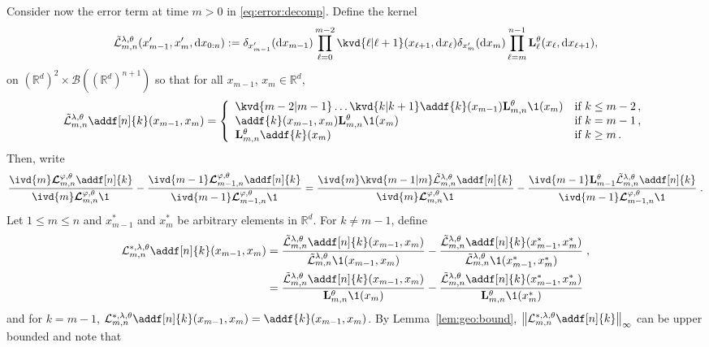 \documentclass{article}
\begin{document}
Consider now the error term at time $m>0$ in \eqref{eq:error:decomp}.  Define the kernel  
\begin{equation} \label{eq:def:retrokmod:joint}
    \tilde{\mathcal{L}}^{\parvar,\parvec}_{m, n}(x'_{m-1},x_m', \rmd x_{0:n}) \eqdef \delta_{x'_{m-1}}(\rmd x_{m-1})  \prod_{\ell = 0}^{m - 2} \kvd{\ell \vert \ell+1}(x_{\ell + 1}, \rmd x_\ell) \delta_{x_m'}(\rmd x_m) \prod_{\ell = m}^{n - 1} \uk{\ell}{\parvec}(x_\ell, \rmd x_{\ell + 1}), 
\end{equation}
on  $(\mathbb{R}^d)^2 \times \mathcal{B}((\mathbb{R}^d)^{n+1})$ so that for all $x_{m-1}$, $x_m\in\mathbb{R}^d$,
$$
\tilde{\mathcal{L}}^{\parvar,\parvec}_{m, n}\addf[n]{k}(x_{m-1},x_m) = \left\{
    \begin{array}{ll}
      \kvd{m-2 \vert m-1}\ldots \kvd{k \vert k+1}\addf{k}(x_{m-1})\uk{m, n}{\parvec}\1(x_m) & \mbox{if } k\leq m-2\,, \\
      \addf{k}(x_{m-1},x_m)\uk{m, n}{\parvec}\1(x_m) & \mbox{if } k = m-1\,, \\
       \uk{m, n}{\parvec}\addf{k}(x_m)  & \mbox{if } k\geq m\,.
    \end{array}
\right.
$$
Then, write
$$
\frac{\ivd{m} \retrokmod_{m, n} \addf[n]{k}}{\ivd{m} \retrokmod_{m, n} \1_{}}
- \frac{\ivd{m - 1} \retrokmod_{m - 1, n} \addf[n]{k}}{\ivd{m - 1} \retrokmod_{m - 1, n} \1_{}} 
=
\frac{\ivd{m} \kvd{m-1 \vert m} \tilde{\mathcal{L}}^{\parvar,\parvec}_{m, n} \addf[n]{k}}{\ivd{m} \retrokmod_{m, n} \1_{}}
- \frac{\ivd{m - 1} \uk{m-1}{\parvec} \tilde{\mathcal{L}}^{\parvar,\parvec}_{m, n} \addf[n]{k}}{\ivd{m - 1} \retrokmod_{m - 1, n} \1_{}} \eqsp.
$$
Let $1\leq m \leq n$ and $x_{m-1}^*$ and $x_m^*$ be arbitrary elements in $\mathbb{R}^d$. For $k\neq m-1$, define 
\begin{align}
\mathcal{L}^{*,\parvar,\parvec}_{m, n}\addf[n]{k}(x_{m-1},x_m) &= \frac{\tilde{\mathcal{L}}^{\parvar,\parvec}_{m, n}\addf[n]{k}(x_{m-1},x_m) }{\tilde{\mathcal{L}}^{\parvar,\parvec}_{m, n}\1(x_{m-1},x_m)} - \frac{\tilde{\mathcal{L}}^{\parvar,\parvec}_{m, n}\addf[n]{k}(x^*_{m-1},x^*_m) }{\tilde{\mathcal{L}}^{\parvar,\parvec}_{m, n}\1(x^*_{m-1},x^*_m)}\eqsp,\label{eq:def:lstar}\\
&= \frac{\tilde{\mathcal{L}}^{\parvar,\parvec}_{m, n}\addf[n]{k}(x_{m-1},x_m) }{\uk{m, n}{\parvec}\1(x_m)} - \frac{\tilde{\mathcal{L}}^{\parvar,\parvec}_{m, n}\addf[n]{k}(x^*_{m-1},x^*_m) }{\uk{m, n}{\parvec}\1(x^*_m)}\nonumber
\end{align}
and for $k=m-1$, $\mathcal{L}^{*,\parvar,\parvec}_{m, n}\addf[n]{k}(x_{m-1},x_m) = \addf{k}(x_{m-1},x_m)$. By Lemma~\ref{lem:geo:bound}, $\left\|\mathcal{L}^{*,\parvar,\parvec}_{m, n} \addf[n]{k}\right\|_\infty$ can be upper bounded and note that
\end{document}
